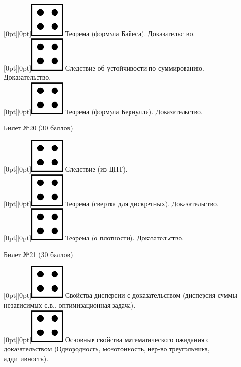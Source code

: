 \documentclass[preview]{standalone}
\begin{document}
\raisebox{-1pt}[0pt][0pt]{\includegraphics[width=0.02\linewidth]{4.png}} Теорема (формула Байеса). Доказательство. \\
\raisebox{-1pt}[0pt][0pt]{\includegraphics[width=0.02\linewidth]{4.png}} Следствие об устойчивости по суммированию. Доказательство. \\
\raisebox{-1pt}[0pt][0pt]{\includegraphics[width=0.02\linewidth]{4.png}} Теорема (формула Бернулли). Доказательство. \\
\begin{center} {\Large Билет №20 (30 баллов)} \end{center}
\raisebox{-1pt}[0pt][0pt]{\includegraphics[width=0.02\linewidth]{4.png}} Следствие (из ЦПТ). \\
\raisebox{-1pt}[0pt][0pt]{\includegraphics[width=0.02\linewidth]{4.png}} Теорема (свертка для дискретных).  Доказательство. \\
\raisebox{-1pt}[0pt][0pt]{\includegraphics[width=0.02\linewidth]{4.png}} Теорема (о плотности). Доказательство. \\
\begin{center} {\Large Билет №21 (30 баллов)} \end{center}
\raisebox{-1pt}[0pt][0pt]{\includegraphics[width=0.02\linewidth]{4.png}} Свойства дисперсии с доказательством (дисперсия суммы независимых с.в., оптимизационная задача). \\ 
\raisebox{-1pt}[0pt][0pt]{\includegraphics[width=0.02\linewidth]{4.png}} Основные свойства математического ожидания с доказательством (Однородность, монотонность, нер-во треугольника, аддитивность). \\
\end{document}
